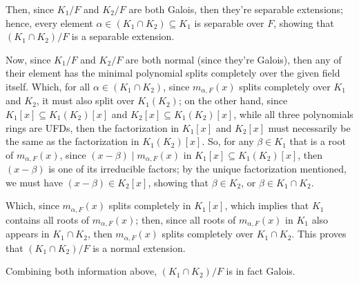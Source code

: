 \documentclass{article}
\begin{document}
\hfil

Then, since $K_1/F$ and $K_2/F$ are both Galois, then they're separable extensions; hence, every element $\alpha\in (K_1\cap K_2)\subseteq K_1$ is separable over $F$, showing that $(K_1\cap K_2)/ F$ is a separable extension.

\hfil

Now, since $K_1/F$ and $K_2/F$ are both normal (since they're Galois), then any of their element has the minimal polynomial splits completely over the given field itself. Which, for all $\alpha\in (K_1\cap K_2)$, since $m_{\alpha,F}(x)$ splits completely over $K_1$ and $K_2$, it must also split over $K_1(K_2)$; on the other hand, since $K_1[x]\subseteq K_1(K_2)[x]$ and $K_2[x]\subseteq K_1(K_2)[x]$, while all three polynomials rings are UFDs, then the factorization in $K_1[x]$ and $K_2[x]$ must necessarily be the same as the factorization in $K_1(K_2)[x]$. So, for any $\beta\in K_1$ that is a root of $m_{\alpha,F}(x)$, since $(x-\beta)\mid m_{\alpha,F}(x)$ in $K_1[x]\subseteq K_1(K_2)[x]$, then $(x-\beta)$ is one of its irreducible factors; by the unique factorization mentioned, we must have $(x-\beta)\in K_2[x]$, showing that $\beta\in K_2$, or $\beta\in K_1\cap K_2$.

Which, since $m_{\alpha,F}(x)$ splits completely in $K_1[x]$, which implies that $K_1$ contains all roots of $m_{\alpha,F}(x)$; then, since all roots of $m_{\alpha,F}(x)$ in $K_1$ also appears in $K_1\cap K_2$, then $m_{\alpha,F}(x)$ splits completely over $K_1\cap K_2$. This proves that $(K_1\cap K_2)/F$ is a normal extension.

\hfil

Combining both information above, $(K_1\cap K_2)/F$ is in fact Galois.
\end{document}

